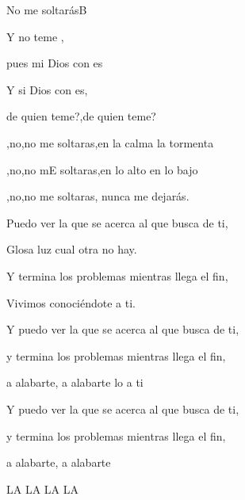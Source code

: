 \documentclass[12pt, spanish]{book}
\begin{document}
\begin{song}{No me soltarás}{B}
\begin{SBExtraKeys}
{            \begin{SBOpGroup}
                Y no teme   ,

                pues mi Dios con es

                Y si Dios con es,

                de quien teme?,de quien teme?
            \end{SBOpGroup}

            \begin{SBChorus}
                ,no,no me soltaras,en la calma la tormenta

                ,no,no mE soltaras,en lo alto en lo bajo

                ,no,no me soltaras, nunca me dejarás.

                Puedo ver la  que se acerca al que busca de ti,

                Glosa luz cual otra no hay.

                Y termina los problemas mientras llega el fin,

                Vivimos conociéndote a ti.
            \end{SBChorus}

            \begin{SBOpGroup}
                Y puedo ver la  que se acerca al que busca de ti,

                y termina los problemas mientras llega el fin,

                 a alabarte,  a alabarte lo a ti
            \end{SBOpGroup}

            \begin{SBOpGroup}
                Y puedo ver la  que se acerca al que busca de ti,

                y termina los problemas mientras llega el fin,

                 a alabarte,  a alabarte
            \end{SBOpGroup}

            \begin{SBOpGroup}
                 LA LA   LA LA


\end{SBOpGroup}}
\end{SBExtraKeys}
\end{song}
\end{document}
